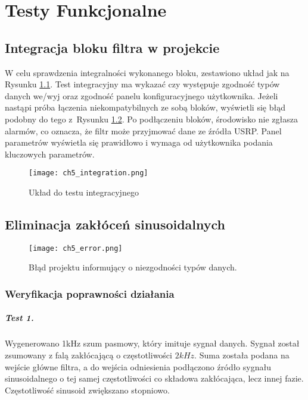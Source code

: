 \chapter{Testy Funkcjonalne}
\section{Integracja bloku filtra w projekcie}

W celu sprawdzenia integralności wykonanego bloku, zestawiono układ jak na Rysunku \ref{fig:itest}.
Test integracyjny ma wykazać czy występuje zgodność typów danych we/wyj oraz zgodność panelu konfiguracyjnego użytkownika.
Jeżeli nastąpi próba łączenia niekompatybilnych ze sobą bloków, wyświetli się błąd podobny do tego z~Rysunku \ref{fig:error}.
Po podłączeniu bloków, środowisko nie zgłasza alarmów, co oznacza, że filtr może przyjmować dane ze źródła USRP. 
Panel parametrów wyświetla się prawidłowo i wymaga od użytkownika podania kluczowych parametrów.
  
\begin{figure}[ht]
\centering
\texttt{[image: ch5\_integration.png]}
\caption{Układ do testu integracyjnego}
\label{fig:itest}
\end{figure}

\section{Eliminacja zakłóceń sinusoidalnych}

\begin{figure}[ht]
\centering
\texttt{[image: ch5\_error.png]}
\caption{Błąd projektu informujący o niezgodności typów danych.}
\label{fig:error}
\end{figure}
\subsection{Weryfikacja poprawności działania}

\paragraph{Test 1.}
Wygenerowano 1kHz szum pasmowy, który imituje sygnał danych.
Sygnał został zsumowany z falą zakłócającą o częstotliwości $2kHz$.
Suma została podana na wejście główne filtra, a do wejścia odniesienia podłączono źródło sygnału sinusoidalnego o tej samej częstotliwości co składowa zakłócająca, lecz innej fazie.
Częstotliwość sinusoid zwiększano stopniowo.

